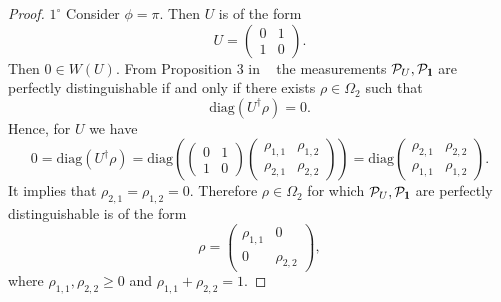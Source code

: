 \documentclass[preprint,12pt, a4paper]{elsarticle}
\newcommand{\1}{{\rm 1\hspace{-0.9mm}l}}
\begin{document}
\begin{proof}
	$1^\circ$ Consider $\phi = \pi$. Then $U$ is of the form
	\begin{equation}
	U = \left(\begin{array}{cc}0&1\\1&0\end{array}\right).
	\end{equation}
Then $0 \in W(U)$. 	From Proposition 3 in ~\cite{puchala2018strategies} the 
measurements $\mathcal{P}_U, \mathcal{P}_\1$ are perfectly distinguishable if 
and only if there exists $\rho \in \Omega_2$ such that
	\begin{equation}
	\mathrm{diag}\left(U^\dagger \rho\right) = 0.
	\end{equation}
Hence, for $U $ we have 
	\begin{equation}
	0 = \mathrm{diag}\left(U^\dagger \rho\right) = \mathrm{diag} 
	\left(\left(\begin{array}{cc}0&1\\1&0\end{array}\right)\left(\begin{array}{cc}\rho_{1,1}&\rho_{1,2}\\\rho_{2,1}&\rho_{2,2}\end{array}\right)\right)
	 =  \mathrm{diag} 
	\left(\begin{array}{cc}\rho_{2,1}&\rho_{2,2}\\\rho_{1,1}&\rho_{1,2}\end{array}\right).
	\end{equation}
 It implies that $\rho_{2,1}=\rho_{1,2} = 0$. Therefore $\rho \in \Omega_2$ for 
 which $\mathcal{P}_U, \mathcal{P}_\1$  are perfectly distinguishable is of the 
 form
	\begin{equation}
	\rho = \left(\begin{array}{cc}\rho_{1,1}&0\\0&\rho_{2,2}\end{array}\right),
	\end{equation}
	where $\rho_{1,1},\rho_{2,2} \ge 0$ and  $\rho_{1,1}+\rho_{2,2}=1$.


\end{proof}
\end{document}
